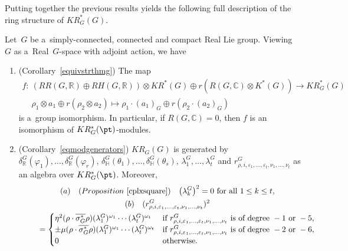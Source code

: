 Putting together the previous results yields the following full description of the ring structure of $KR_G^*(G)$.
\begin{Theorem}
\label{mainthm2}
Let~$G$ be a~simply-connected, connected and compact Real Lie group.
Viewing~$G$ as a~Real~$G$-space with adjoint action, we have
\begin{enumerate}\itemsep=0pt
\item[$1.$] {\rm (}Corollary~{\rm \ref{equivstrthmg})} The map
\begin{gather*}
f: \ (RR(G, \mathbb{R})\oplus RH(G, \mathbb{R}))\otimes KR^*(G)\oplus r(R(G, \mathbb{C})\otimes K^*(G))\to KR_G^*(G)
\\
\phantom{f: {}} \
\rho_1\otimes a_1\oplus r(\rho_2\otimes a_2)\mapsto \rho_1\cdot (a_1)_{G}\oplus r(\rho_2\cdot (a_2)_G)
\end{gather*}
is a~group isomorphism.
In particular, if $R(G, \mathbb{C})=0$, then $f$ is an isomorphism of $KR^*_{G}(\pt)$-modules.
\item[$2.$] {\rm (}Corollary~{\rm \ref{eqmodgenerators})}
$KR_{G}(G)$ is generated by $\delta_\mathbb{R}^G(\varphi_1), {\dots}, \delta_\mathbb{R}^G(\varphi_r)$,
$\delta_\mathbb{H}^G(\theta_1), {\dots}, \delta_\mathbb{H}^G(\theta_s)$, $\lambda_1^G, {\dots}, \lambda_t^G\!$ and
$r^G_{\rho, i, \varepsilon_1, \dots, \varepsilon_t, \nu_1, \dots, \nu_t}$ as an algebra over $KR_{G}^*(\pt)$.
Moreover,
\begin{gather}
(a)\quad{\rm (}Proposition~{\rm \ref{cplxsquare})} \quad \big(\lambda_k^G\big)^2=0\text{ for all }1\leq k\leq t,\nonumber
\\ \label{cplxrel1}
(b)\quad
(r^G_{\rho, i, \varepsilon_1, \dots, \varepsilon_t, \nu_1, \dots, \nu_t})^2
\\
\phantom{(b)\quad}
=
\begin{cases}
\eta^2(\rho\cdot\overline{\sigma_G^*}
\rho)(\lambda^G_1)^{\omega_1}\cdots(\lambda_t^G)^{\omega_t}
&
\text{if }r^G_{\rho, i, \varepsilon_1, \dots, \varepsilon_t, \nu_1, \dots, \nu_t}
\text{ is of degree} \ -1\text{ or }-5,
\\
\pm\mu(\rho\cdot\overline{\sigma_G^*}
\rho)(\lambda^G_1)^{\omega_1}\cdots(\lambda_t^G)^{\omega_t}
&
\text{if }r^G_{\rho, i, \varepsilon_1, \dots, \varepsilon_t, \nu_1, \dots, \nu_t}
\text{ is of degree} \ -2\text{ or }-6,
\\
0
&\text{otherwise}.
\end{cases}
\nonumber
\end{gather}

\end{enumerate}
\end{Theorem}

